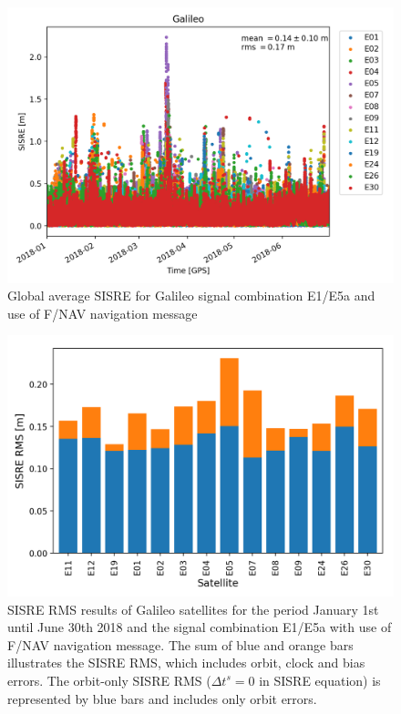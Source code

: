 \documentclass{beamer}
\begin{document}
\begin{frame}[t]
\begin{columns}
\begin{column}[t]{.28\textwidth}
     \vspace*{1cm}
     \begin{figure}
       \includegraphics[width=\linewidth]{figure/plot_scatter_sisre_galileo}
       \caption{Global average SISRE for Galileo signal combination E1/E5a and use of F/NAV navigation message}
       \label{fig:sisre}
     \end{figure}

     \vspace*{1.5cm}

     \begin{figure}
       \includegraphics[width=\linewidth]{figure/plot_bar_stacked_sisre}
       \caption{SISRE RMS results of Galileo satellites for the period January 1st until June 30th 2018 and the signal combination E1/E5a with use of F/NAV navigation message. The sum of blue and orange bars illustrates the SISRE RMS, which includes orbit, clock and bias errors. The orbit-only SISRE RMS ($\Delta t^s = 0$ in SISRE equation) is represented by blue bars and includes only orbit errors.
}
       \label{fig:sisre_stacked}
     \end{figure}


\end{column}
\end{columns}
\end{frame}
\end{document}
